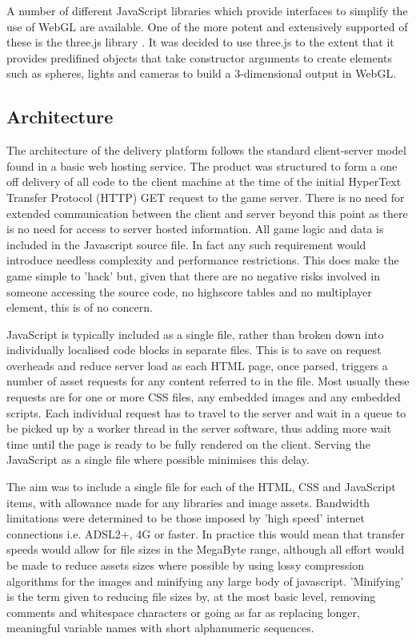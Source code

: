 \documentclass[twoside]{bhamthesis}
\begin{document}
A number of different JavaScript libraries which provide interfaces to simplify the use of WebGL are available. One of the more potent and extensively supported of these is the three.js library \cite{cabello_three.js_????}. It was decided to use three.js to the extent that it provides predifined objects that take constructor arguments to create elements such as spheres, lights and cameras to build a 3-dimensional output in WebGL.

\subsection{Architecture}

The architecture of the delivery platform follows the standard client-server model found in a basic web hosting service. The product was structured to form a one off delivery of all code to the client machine at the time of the initial HyperText Transfer Protocol (HTTP) GET request to the game server. There is no need for extended communication between the client and server beyond this point as there is no need for access to server hosted information. All game logic and data is included in the Javascript source file. In fact any such requirement would introduce needless complexity and performance restrictions. This does make the game simple to 'hack' but, given that there are no negative risks involved in someone accessing the source code, no highscore tables and no multiplayer element, this is of no concern.

JavaScript is typically included as a single file, rather than broken down into individually localised code blocks in separate files. This is to save on request overheads and reduce server load as each HTML page, once parsed, triggers a number of asset requests for any content referred to in the file. Most usually these requests are for one or more CSS files, any embedded images and any embedded scripts. Each individual request has to travel to the server and wait in a queue to be picked up by a worker thread in the server software, thus adding more wait time until the page is ready to be fully rendered on the client. Serving the JavaScript as a single file where possible minimises this delay.

The aim was to include a single file for each of the HTML, CSS and JavaScript items, with allowance made for any libraries and image assets. Bandwidth limitations were determined to be those imposed by 'high speed' internet connections i.e. ADSL2+, 4G or faster. In practice this would mean that transfer speeds would allow for file sizes in the MegaByte range, although all effort would be made to reduce assets sizes where possible by using lossy compression algorithms for the images and minifying any large body of javascript. 'Minifying' is the term given to reducing file sizes by, at the most basic level, removing comments and whitespace characters or going as far as replacing longer, meaningful variable names with short alphanumeric sequences.
\end{document}

